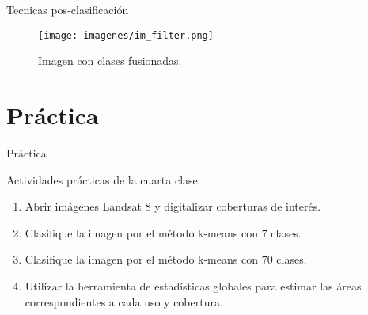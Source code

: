 \documentclass[handout]{beamer}
\begin{document}
\begin{frame}{Tecnicas pos-clasificación}
  \begin{figure}
    \texttt{[image: imagenes/im\_filter.png]}
    \caption{Imagen con clases fusionadas.}
  \end{figure}
\end{frame}

\section{Práctica}

\begin{frame}{Práctica}
  \begin{exampleblock}{Actividades prácticas de la cuarta clase}
    \begin{enumerate}[<+>]
      \item Abrir imágenes Landsat 8 y digitalizar coberturas de interés.
      \item Clasifique la imagen por el método k-means con 7 clases.
      \item Clasifique la imagen por el método k-means con 70 clases.
      \item Utilizar la herramienta de estad\'isticas globales para estimar las áreas correspondientes a cada uso y cobertura.
    \end{enumerate}
  \end{exampleblock}
\end{frame}
\end{document}
